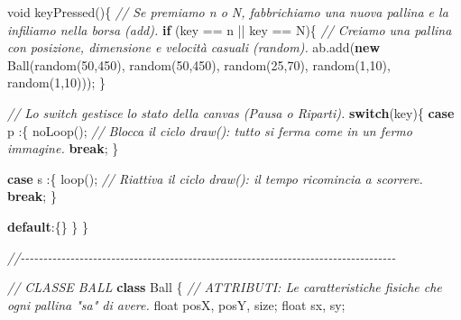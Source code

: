 \documentclass[
]{article}
\newenvironment{Shaded}{}{}
\newcommand{\CharTok}[1]{\textcolor[rgb]{0.25,0.44,0.63}{#1}}
\newcommand{\CommentTok}[1]{\textcolor[rgb]{0.38,0.63,0.69}{\textit{#1}}}
\newcommand{\ControlFlowTok}[1]{\textcolor[rgb]{0.00,0.44,0.13}{\textbf{#1}}}
\newcommand{\DataTypeTok}[1]{\textcolor[rgb]{0.56,0.13,0.00}{#1}}
\newcommand{\DecValTok}[1]{\textcolor[rgb]{0.25,0.63,0.44}{#1}}
\newcommand{\FunctionTok}[1]{\textcolor[rgb]{0.02,0.16,0.49}{#1}}
\newcommand{\KeywordTok}[1]{\textcolor[rgb]{0.00,0.44,0.13}{\textbf{#1}}}
\newcommand{\NormalTok}[1]{#1}
\newcommand{\OperatorTok}[1]{\textcolor[rgb]{0.40,0.40,0.40}{#1}}
\begin{document}
\begin{Shaded}
\begin{Highlighting}[]
\DataTypeTok{void} \FunctionTok{keyPressed}\OperatorTok{()\{} 
  \CommentTok{// Se premiamo \textquotesingle{}n\textquotesingle{} o \textquotesingle{}N\textquotesingle{}, fabbrichiamo una nuova pallina e la infiliamo nella borsa (add).}
  \ControlFlowTok{if} \OperatorTok{(}\NormalTok{key }\OperatorTok{==} \CharTok{\textquotesingle{}n\textquotesingle{}} \OperatorTok{||}\NormalTok{ key }\OperatorTok{==} \CharTok{\textquotesingle{}N\textquotesingle{}}\OperatorTok{)\{}
    \CommentTok{// Creiamo una pallina con posizione, dimensione e velocità casuali (random).}
\NormalTok{    ab}\OperatorTok{.}\FunctionTok{add}\OperatorTok{(}\KeywordTok{new} \FunctionTok{Ball}\OperatorTok{(}\FunctionTok{random}\OperatorTok{(}\DecValTok{50}\OperatorTok{,}\DecValTok{450}\OperatorTok{),} \FunctionTok{random}\OperatorTok{(}\DecValTok{50}\OperatorTok{,}\DecValTok{450}\OperatorTok{),} \FunctionTok{random}\OperatorTok{(}\DecValTok{25}\OperatorTok{,}\DecValTok{70}\OperatorTok{),} \FunctionTok{random}\OperatorTok{(}\DecValTok{1}\OperatorTok{,}\DecValTok{10}\OperatorTok{),} \FunctionTok{random}\OperatorTok{(}\DecValTok{1}\OperatorTok{,}\DecValTok{10}\OperatorTok{)));}
  \OperatorTok{\}}
  
  \CommentTok{// Lo switch gestisce lo stato della canvas (Pausa o Riparti).}
  \ControlFlowTok{switch}\OperatorTok{(}\NormalTok{key}\OperatorTok{)\{}
    \ControlFlowTok{case} \CharTok{\textquotesingle{}p\textquotesingle{}} \OperatorTok{:\{} 
      \FunctionTok{noLoop}\OperatorTok{();} \CommentTok{// Blocca il ciclo draw(): tutto si ferma come in un fermo immagine.}
      \ControlFlowTok{break}\OperatorTok{;}
    \OperatorTok{\}}
    
    \ControlFlowTok{case} \CharTok{\textquotesingle{}s\textquotesingle{}} \OperatorTok{:\{} 
      \FunctionTok{loop}\OperatorTok{();}   \CommentTok{// Riattiva il ciclo draw(): il tempo ricomincia a scorrere.}
      \ControlFlowTok{break}\OperatorTok{;}
    \OperatorTok{\}}
    
    \KeywordTok{default}\OperatorTok{:\{\}}
  \OperatorTok{\}}
\OperatorTok{\}}

\CommentTok{//{-}{-}{-}{-}{-}{-}{-}{-}{-}{-}{-}{-}{-}{-}{-}{-}{-}{-}{-}{-}{-}{-}{-}{-}{-}{-}{-}{-}{-}{-}{-}{-}{-}{-}{-}{-}{-}{-}{-}{-}{-}{-}{-}{-}{-}{-}{-}{-}{-}{-}{-}{-}{-}{-}{-}{-}{-}{-}{-}{-}{-}{-}{-}{-}{-}{-}{-}{-}{-}{-}{-}{-}{-}{-}{-}{-}{-}{-}{-}{-}{-}{-}{-}}

\CommentTok{// CLASSE BALL}
\KeywordTok{class}\NormalTok{ Ball }\OperatorTok{\{}
  \CommentTok{// ATTRIBUTI: Le caratteristiche fisiche che ogni pallina "sa" di avere.}
  \DataTypeTok{float}\NormalTok{ posX}\OperatorTok{,}\NormalTok{ posY}\OperatorTok{,}\NormalTok{ size}\OperatorTok{;} 
  \DataTypeTok{float}\NormalTok{ sx}\OperatorTok{,}\NormalTok{ sy}\OperatorTok{;} 


\end{Highlighting}
\end{Shaded}
\end{document}
